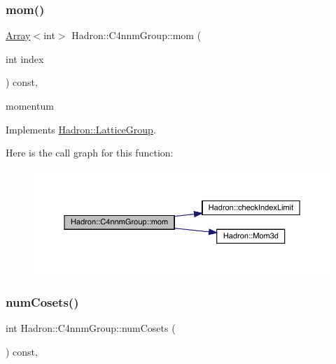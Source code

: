 \subsubsection{\texorpdfstring{mom()}{mom()}\hspace{0.1cm}{\footnotesize\ttfamily [2/2]}}
{\footnotesize\ttfamily \mbox{\hyperlink{classXMLArray_1_1Array}{Array}}$<$int$>$ Hadron\+::\+C4nnm\+Group\+::mom (\begin{DoxyParamCaption}\item[{int}]{index }\end{DoxyParamCaption}) const\hspace{0.3cm}{\ttfamily [inline]}, {\ttfamily [virtual]}}

momentum 

Implements \mbox{\hyperlink{structHadron_1_1LatticeGroup_ad577b65041dd9a6e84b1f3bd49cb8fce}{Hadron\+::\+Lattice\+Group}}.

Here is the call graph for this function\+:
\nopagebreak
\begin{figure}[H]
\begin{center}
\leavevmode
\includegraphics[width=350pt]{d1/dba/structHadron_1_1C4nnmGroup_a7553c7f91a8dc310b37b7b5da32e98f6_cgraph}
\end{center}
\end{figure}
\mbox{\label{structHadron_1_1C4nnmGroup_a38cf4c54a4dff0a3c056aa3a1dc4dca2}} 
\subsubsection{\texorpdfstring{numCosets()}{numCosets()}\hspace{0.1cm}{\footnotesize\ttfamily [1/2]}}
{\footnotesize\ttfamily int Hadron\+::\+C4nnm\+Group\+::num\+Cosets (\begin{DoxyParamCaption}{ }\end{DoxyParamCaption}) const\hspace{0.3cm}{\ttfamily [inline]}, {\ttfamily [virtual]}}

